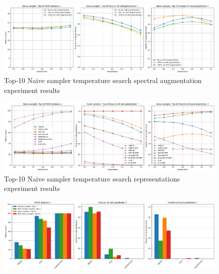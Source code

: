 \begin{figure}[h]
    \centering
    \includegraphics[width=1.0\textwidth]{figures/appendix/spectal_augmentation.png}
    \caption{Top-10 Naive sampler temperature search spectral augmentation experiment results}
    \label{fig:spectral_augmentation_appendix}
\end{figure}

\begin{figure}[h]
    \centering
    \includegraphics[width=1.0\textwidth]{figures/appendix/representations.png}
    \caption{Top-10 Naive sampler temperature search representations experiment results}
    \label{fig:representations_appendix}
\end{figure}

\begin{figure}[h]
    \centering
    \includegraphics[width=1.0\textwidth]{figures/appendix/layered_inchi.png}
    \caption{}
    \label{fig:layered_inchi}
\end{figure}
